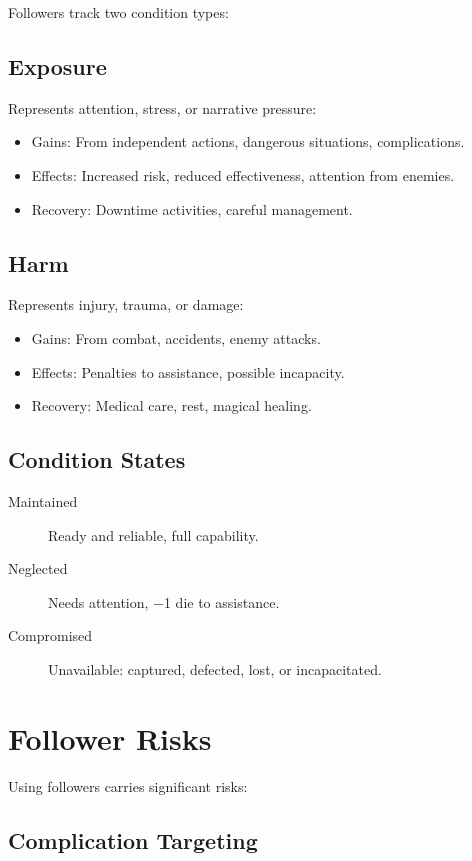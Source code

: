 \documentclass[11pt,twoside,openany]{book}
\begin{document}
Followers track two condition types:

\subsection*{Exposure}

Represents attention, stress, or narrative pressure:
\begin{itemize}
\item Gains: From independent actions, dangerous situations, complications.
\item Effects: Increased risk, reduced effectiveness, attention from enemies.
\item Recovery: Downtime activities, careful management.
\end{itemize}

\subsection*{Harm}

Represents injury, trauma, or damage:
\begin{itemize}
\item Gains: From combat, accidents, enemy attacks.
\item Effects: Penalties to assistance, possible incapacity.
\item Recovery: Medical care, rest, magical healing.
\end{itemize}

\subsection*{Condition States}

\begin{description}
\item[Maintained] Ready and reliable, full capability.
\item[Neglected] Needs attention, −1 die to assistance.
\item[Compromised] Unavailable: captured, defected, lost, or incapacitated.
\end{description}

\section*{Follower Risks} 

Using followers carries significant risks:

\subsection*{Complication Targeting}
\end{document}
